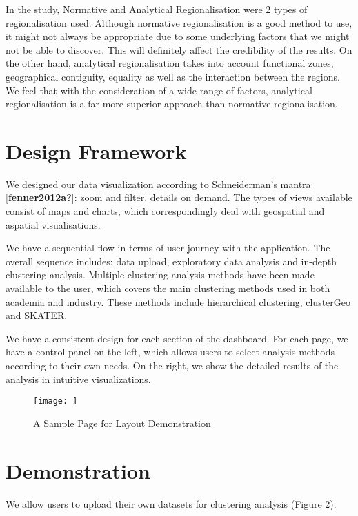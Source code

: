 \documentclass{acm_proc_article-sp}
\begin{document}
In the study, Normative and Analytical Regionalisation were 2 types of
regionalisation used. Although normative regionalisation is a good
method to use, it might not always be appropriate due to some underlying
factors that we might not be able to discover. This will definitely
affect the credibility of the results. On the other hand, analytical
regionalisation takes into account functional zones, geographical
contiguity, equality as well as the interaction between the regions. We
feel that with the consideration of a wide range of factors, analytical
regionalisation is a far more superior approach than normative
regionalisation.

\hypertarget{design-framework}{%
\section{Design Framework}\label{design-framework}}

We designed our data visualization according to Schneiderman's mantra
{[}\textbf{fenner2012a?}{]}: zoom and filter, details on demand. The
types of views available consist of maps and charts, which
correspondingly deal with geospatial and aspatial visualisations.

We have a sequential flow in terms of user journey with the application.
The overall sequence includes: data upload, exploratory data analysis
and in-depth clustering analysis. Multiple clustering analysis methods
have been made available to the user, which covers the main clustering
methods used in both academia and industry. These methods include
hierarchical clustering, clusterGeo and SKATER.

We have a consistent design for each section of the dashboard. For each
page, we have a control panel on the left, which allows users to select
analysis methods according to their own needs. On the right, we show the
detailed results of the analysis in intuitive visualizations.

\begin{figure}
\centering
\texttt{[image: ]}
\caption{A Sample Page for Layout Demonstration}
\end{figure}

\hypertarget{demonstration}{%
\section{Demonstration}\label{demonstration}}

We allow users to upload their own datasets for clustering analysis
(Figure 2).
\end{document}
